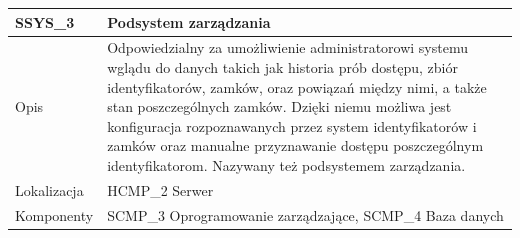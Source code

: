 \begin{table}
\begin{subtable}[c]{\textwidth}
                        \centering
                        \begin{tabular}{p{2cm}|p{12cm}}
                            SSYS\_3      & \textbf{Podsystem zarządzania} \\
                            \hline Opis         & Odpowiedzialny za umożliwienie administratorowi systemu wglądu do danych takich jak historia prób dostępu, zbiór identyfikatorów, zamków, oraz powiązań między nimi, a także stan poszczególnych zamków. Dzięki niemu możliwa jest konfiguracja rozpoznawanych przez system identyfikatorów i zamków oraz manualne przyznawanie dostępu poszczególnym identyfikatorom. Nazywany też podsystemem zarządzania. \\
                            \hline Lokalizacja  & HCMP\_2 Serwer    \\
                            \hline Komponenty   & SCMP\_3 Oprogramowanie zarządzające, SCMP\_4 Baza danych \\
                        \end{tabular}
                        \label{tbl:ssys3}      
                    \end{subtable}                 
                    \label{tbl:subsystems}
                \end{table}

